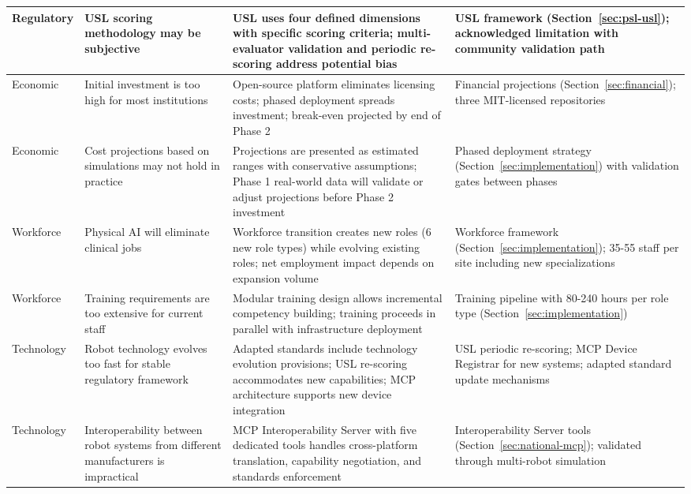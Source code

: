 \begin{longtable}{p{2.2cm} p{3.5cm} p{3.0cm} p{3.0cm}}
\midrule
Regulatory & USL scoring methodology may be subjective & USL uses four defined dimensions with specific scoring criteria; multi-evaluator validation and periodic re-scoring address potential bias & USL framework (Section~\ref{sec:psl-usl}); acknowledged limitation with community validation path \\
\midrule
Economic & Initial investment is too high for most institutions & Open-source platform eliminates licensing costs; phased deployment spreads investment; break-even projected by end of Phase 2 & Financial projections (Section~\ref{sec:financial}); three MIT-licensed repositories \cite{main-repo, mcp-repo, fl-repo} \\
\midrule
Economic & Cost projections based on simulations may not hold in practice & Projections are presented as estimated ranges with conservative assumptions; Phase 1 real-world data will validate or adjust projections before Phase 2 investment & Phased deployment strategy (Section~\ref{sec:implementation}) with validation gates between phases \\
\midrule
Workforce & Physical AI will eliminate clinical jobs & Workforce transition creates new roles (6 new role types) while evolving existing roles; net employment impact depends on expansion volume & Workforce framework (Section~\ref{sec:implementation}); 35-55 staff per site including new specializations \\
\midrule
Workforce & Training requirements are too extensive for current staff & Modular training design allows incremental competency building; training proceeds in parallel with infrastructure deployment & Training pipeline with 80-240 hours per role type (Section~\ref{sec:implementation}) \\
\midrule
Technology & Robot technology evolves too fast for stable regulatory framework & Adapted standards include technology evolution provisions; USL re-scoring accommodates new capabilities; MCP architecture supports new device integration & USL periodic re-scoring; MCP Device Registrar for new systems; adapted standard update mechanisms \\
\midrule
Technology & Interoperability between robot systems from different manufacturers is impractical & MCP Interoperability Server with five dedicated tools handles cross-platform translation, capability negotiation, and standards enforcement & Interoperability Server tools (Section~\ref{sec:national-mcp}); validated through multi-robot simulation \cite{site-docs} \\
\midrule

\end{longtable}
